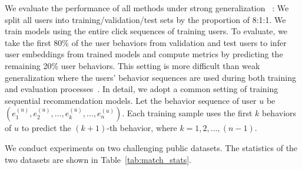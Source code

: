 
We evaluate the performance of all methods under strong generalization ~\cite{marlin2004collaborative, liang2018variational, ma2019learning}: We split all users into training/validation/test sets by the proportion of 8:1:1. We train models using the entire click sequences of training users. To evaluate, we take the first 80\% of the user behaviors from validation and test users to infer user embeddings from trained models and compute metrics by predicting the remaining 20\% user behaviors. This setting is more difficult than weak generalization where the users' behavior sequences are used during both training and evaluation processes~\cite{liang2018variational}.
In detail, we adopt a common setting of training sequential recommendation models. Let the behavior sequence of user $u$ be $(e_1^{(u)}, e_2^{(u)}, ..., e_k^{(u)}, ..., e_n^{(u)})$. Each training sample uses the first $k$ behaviors of $u$ to predict the $(k+1)$-th behavior, where $k=1,2,...,(n-1)$.

 We conduct experiments on two challenging public datasets. The statistics of the two datasets are shown in Table~\ref{tab:match_stats}. 

